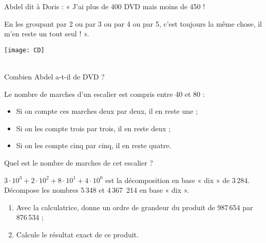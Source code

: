 \begin{exercice}

\vspace{1em}

\begin{minipage}[c]{0.65\linewidth}
Abdel dit à Doris : « J'ai plus de 400 DVD mais moins de 450 !

En les groupant par 2 ou par 3 ou par 4 ou par 5, c'est toujours la même chose, il m'en reste un tout seul ! ».
 \end{minipage} \hfill%
 \begin{minipage}[c]{0.32\linewidth}
  \begin{center} \texttt{[image: CD]} \end{center}
  \end{minipage} \\
Combien Abdel a-t-il de DVD ?
\end{exercice}



\newpage




\begin{exercice}[Escalier]
Le nombre de marches d’un escalier est compris entre 40 et 80 :
\begin{itemize}
 \item Si on compte ces marches deux par deux, il en reste une ;
 \item Si on les compte trois par trois, il en reste deux ;
 \item Si on les compte cinq par cinq, il en reste quatre.
 \end{itemize}
Quel est le nombre de marches de cet escalier ?
\end{exercice}


\begin{exercice}
$3 \cdot 10^3 + 2 \cdot 10^2 + 8 \cdot 10^1 + 4 \cdot 10^0$ est la décomposition en base « dix » de 3\,284. Décompose les nombres 5\,348 et 4\,367 \,214 en base « dix ».
\end{exercice}


\begin{exercice}
\begin{enumerate}
 \item Avec la calculatrice, donne un ordre de grandeur du produit de 987\,654 par 876\,534 ;
 \item Calcule le résultat exact de ce produit.
 \end{enumerate}
\end{exercice}


